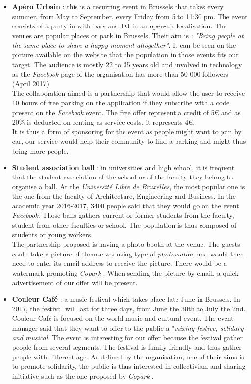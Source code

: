 \documentclass[12pt,a4paper,oneside]{book}
\newcommand{\bp}{\textit{Copark }}
\begin{document}
\begin{itemize}
\item \textbf{Apéro Urbain} : this is a recurring event in Brussels that takes every summer, from May to September, every Friday from 5 to 11:30 pm. The event consists of a party in with bars and DJ in an open-air localisation. The venues are popular places or park in Brussels. Their aim is : \textit{"Bring people at the same place to share a happy moment altogether"}.\cite{aperourbain} It can be seen on the picture available on the website that the population in those events fits our target. The audience is mostly 22 to 35 years old and involved in technology as the \textit{Facebook} page of the organisation has more than 50 000 followers (April 2017).\\
The collaboration aimed is a partnership that would allow the user to receive 10 hours of free parking on the application if they subscribe with a code present on the \textit{Facebook} event. The free offer represent a credit of 5\euro{} and as 20\% is deducted on renting as service costs, it represents 4\euro{}.\\
It is thus a form of sponsoring for the event as people might want to join by car, our service would help their community to find a parking and might thus bring more people.
\item \textbf{Student association ball} : in universities and high school, it is frequent that the student association of the school or of the faculty they belong to organise a ball. At the \textit{Université Libre de Bruxelles}, the most popular one is the one from the faculty of Architecture, Engineering and Business. In the academic year 2016-2017, 3400 people said that they would go on the event \textit{Facebook}. Those balls gathers current or former students from the faculty, student from other faculties or school. The population is thus composed of students or young workers.\\
The partnership proposed is having a photo booth at the venue. The guests could take a picture of themselves using type of \textit{photomaton}, and would then need to enter its email address to receive the picture. There would be a watermark promoting \bp. When sending the picture by email, a quick advertisement of our offer will be present.
\item \textbf{Couleur Café} : a music festival which takes place late June in Brussels. In 2017, the festival will last for three days, from June the 30th to July the 2nd. Couleur Café is focused on the world music and cultural event. The event manager said that they want to offer to the public a "\textit{mixing festive, solidary and musical}.\cite{rtbfcc} The event is interesting for our offer because the festival gather people from several segments. The festival is family-friendly and thus gather people with different age. As defined by the organisation, one of their aims is to promote solidarity, the public is thus interested in collectivism and sharing initiative such as the one proposed by \bp.\\

\end{itemize}
\end{document}
